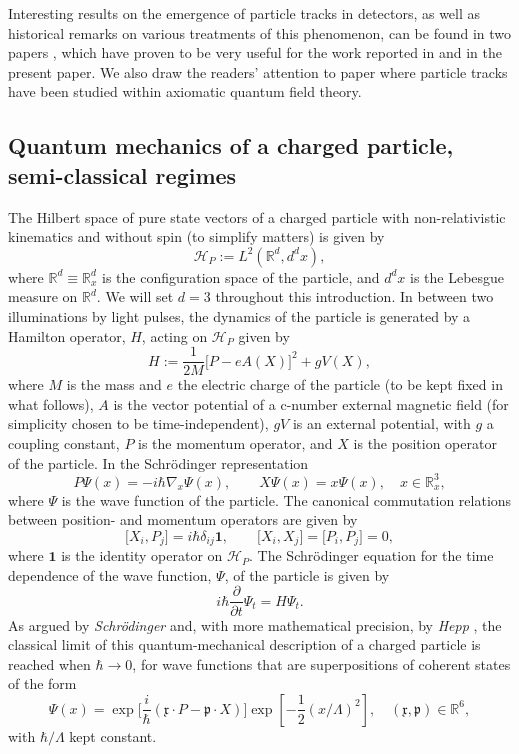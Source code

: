\documentclass[11pt]{article}
\begin{document}
Interesting results on the emergence of particle tracks in detectors, as well as historical remarks 
on various treatments of this phenomenon, can be found in two papers \cite{FT1, FT2}, which 
have proven to be very useful for the work reported in \cite{BBFF} and in the present paper. 
We also draw the readers' attention to paper \cite{Steinmann} where particle tracks have been studied 
within axiomatic quantum field theory.


\subsection{Quantum mechanics of a charged particle, semi-classical regimes}
The Hilbert space of pure state vectors of a charged particle with non-relativistic kinematics and 
without spin (to simplify matters) is given by 
\begin{equation}\label{Hilbert space}
\mathcal{H}_P := L^{2}(\mathbb{R}^{d}, d^{d}x),
\end{equation}
where $\mathbb{R}^{d}\equiv \mathbb{R}^{d}_{x}$ is the configuration space of the particle, and $d^{d}x$ 
is the Lebesgue measure on $\mathbb{R}^{d}$. We will set $d=3$ throughout this introduction.
In between two illuminations by light pulses, the dynamics of the particle is generated by a Hamilton operator, 
$H$, acting on $\mathcal{H}_P$ given by
\begin{equation}\label{Hamiltonian}
H := \frac{1}{2M}\big[P- eA(X)\big]^{2} + gV(X),
\end{equation}
where $M$ is the mass and $e$ the electric charge of the particle (to be kept fixed in what follows), 
$A$ is the vector potential of a \mbox{c-number} external magnetic field (for simplicity chosen to be 
time-independent), $gV$ is an external potential, with $g$ a coupling constant, $P$ is the momentum 
operator, and $X$ is the position operator of the particle. In the Schr\"odinger representation
$$P\Psi(x) = - i \hbar \nabla_{x} \Psi(x), \qquad X\Psi(x) = x\Psi(x), \quad x\in \mathbb{R}^{3}_{x},$$ 
where $\Psi$ is the wave function of the particle. The canonical commutation relations between position- 
and momentum operators are given by
\begin{equation}\label{CCR}
\big[X_i, P_j \big] = i \hbar \delta_{ij} \mathbf{1}, \qquad \big[X_i, X_j\big]=\big[P_i, P_j\big]=0,
\end{equation}
where $\mathbf{1}$ is the identity operator on $\mathcal{H}_P$.
The Schr\"odinger equation for the time dependence of the wave function, $\Psi$, of the particle is given by
\begin{equation}\label{Schrodinger}
i\hbar \frac{\partial}{\partial t} \Psi_{t}= H \Psi_{t}.
\end{equation}
As argued by \textit{Schr\"odinger} \cite{Schrod} and, with more mathematical precision, by 
\textit{Hepp} \cite{Hepp}, the classical limit of this quantum-mechanical description of a charged particle is reached when 
$\hbar \rightarrow 0$, for wave functions that are superpositions of coherent states of the form 
$$\Psi(x)= \exp\Big[\frac{i}{\hbar} (\mathfrak{x}\cdot P-\mathfrak{p}\cdot X)\Big] \exp[-\frac{1}{2} (x/\Lambda)^{2}], \quad (\mathfrak{x}, \mathfrak{p})\in \mathbb{R}^{6},$$
with $\hbar/\Lambda$ kept constant.
\end{document}
